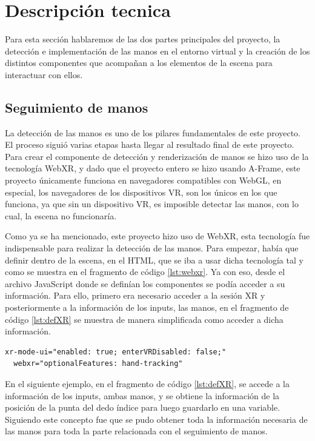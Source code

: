 \documentclass[a4paper, 12pt]{book}
\begin{document}
\section{Descripción tecnica}
\label{sec:descripcion-tecnica}

Para esta sección hablaremos de las dos partes principales del proyecto, la detección e implementación de las manos en el entorno virtual y la creación de los distintos componentes que acompañan a los elementos de la escena para interactuar con ellos.

\subsection{Seguimiento de manos}
\label{subsec:handtracking}
La detección de las manos es uno de los pilares fundamentales de este proyecto. El proceso siguió varias etapas hasta llegar al resultado final de este proyecto. Para crear el componente de detección y renderización de manos se hizo uso de la tecnología WebXR, y dado que el proyecto entero se hizo usando A-Frame, este proyecto únicamente funciona en navegadores compatibles con WebGL, en especial, los navegadores de los dispositivos VR, son los únicos en los que funciona, ya que sin un dispositivo VR, es imposible detectar las manos, con lo cual, la escena no funcionaría.

Como ya se ha mencionado, este proyecto hizo uso de WebXR, esta tecnología fue indispensable para realizar la detección de las manos. Para empezar, había que definir dentro de la escena, en el HTML, que se iba a usar dicha tecnología tal y como se muestra en el fragmento de código \ref{lst:webxr}. Ya con eso, desde el archivo JavaScript donde se definían los componentes se podía acceder a su información. Para ello, primero era necesario acceder a la sesión XR y posteriormente a la información de los inputs, las manos, en el fragmento de código \ref{lst:defXR} se muestra de manera simplificada como acceder a dicha información.

\begin{lstlisting}[caption=Definición de WebXR en la escena, captionpos=b, label=lst:webxr]
  xr-mode-ui="enabled: true; enterVRDisabled: false;" 
  webxr="optionalFeatures: hand-tracking"
\end{lstlisting}

En el siguiente ejemplo, en el fragmento de código \ref{lst:defXR}, se accede a la información de los inputs, ambas manos, y se obtiene la información de la posición de la punta del dedo índice para luego guardarlo en una variable. Siguiendo este concepto fue que se pudo obtener toda la información necesaria de las manos para toda la parte relacionada con el seguimiento de manos.
\end{document}

